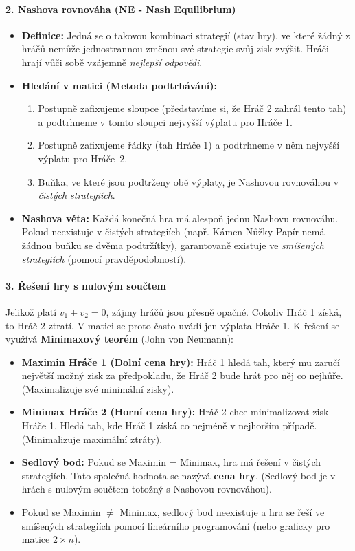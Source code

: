 \paragraph*{2. Nashova rovnováha (NE - Nash Equilibrium)}
\begin{itemize}
    \item \textbf{Definice:} Jedná se o takovou kombinaci strategií (stav hry), ve které žádný z hráčů nemůže jednostrannou změnou své strategie svůj zisk zvýšit. Hráči hrají vůči sobě vzájemně \textit{nejlepší odpovědi}.
    \item \textbf{Hledání v matici (Metoda podtrhávání):} 
    \begin{enumerate}
        \item Postupně zafixujeme sloupce (představíme si, že Hráč 2 zahrál tento tah) a podtrhneme v tomto sloupci nejvyšší výplatu pro Hráče 1.
        \item Postupně zafixujeme řádky (tah Hráče 1) a podtrhneme v něm nejvyšší výplatu pro Hráče~2.
        \item Buňka, ve které jsou podtrženy obě výplaty, je Nashovou rovnováhou v \textit{čistých strategiích}.
    \end{enumerate}
    \item \textbf{Nashova věta:} Každá konečná hra má alespoň jednu Nashovu rovnováhu. Pokud neexistuje v čistých strategiích (např. Kámen-Nůžky-Papír nemá žádnou buňku se dvěma podtržítky), garantovaně existuje ve \textit{smíšených strategiích} (pomocí pravděpodobností).
\end{itemize}

\paragraph*{3. Řešení hry s nulovým součtem}
Jelikož platí $v_1 + v_2 = 0$, zájmy hráčů jsou přesně opačné. Cokoliv Hráč 1 získá, to Hráč 2 ztratí. V matici se proto často uvádí jen výplata Hráče 1. K řešení se využívá \textbf{Minimaxový teorém} (John von Neumann):
\begin{itemize}
    \item \textbf{Maximin Hráče 1 (Dolní cena hry):} Hráč 1 hledá tah, který mu zaručí největší možný zisk za předpokladu, že Hráč 2 bude hrát pro něj co nejhůře. (Maximalizuje své minimální zisky).
    \item \textbf{Minimax Hráče 2 (Horní cena hry):} Hráč 2 chce minimalizovat zisk Hráče 1. Hledá tah, kde Hráč 1 získá co nejméně v nejhorším případě. (Minimalizuje maximální ztráty).
    \item \textbf{Sedlový bod:} Pokud se Maximin = Minimax, hra má řešení v čistých strategiích. Tato společná hodnota se nazývá \textbf{cena hry}. (Sedlový bod je v hrách s nulovým součtem totožný s Nashovou rovnováhou).
    \item Pokud se Maximin $\neq$ Minimax, sedlový bod neexistuje a hra se řeší ve smíšených strategiích pomocí lineárního programování (nebo graficky pro matice $2 \times n$).
\end{itemize}

